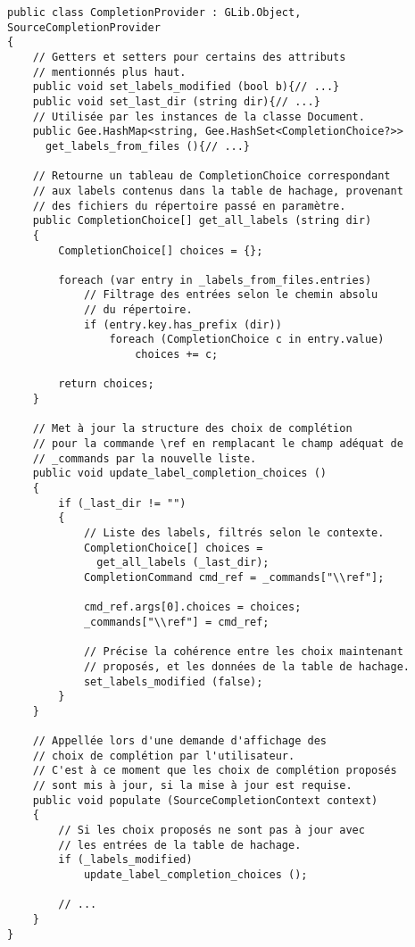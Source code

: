 \documentclass[a4paper,11pt]{report}
\begin{document}
\begin{lstlisting}[frame=single]
public class CompletionProvider : GLib.Object, SourceCompletionProvider
{
    // Getters et setters pour certains des attributs
    // mentionnés plus haut.
    public void set_labels_modified (bool b){// ...}
    public void set_last_dir (string dir){// ...}
    // Utilisée par les instances de la classe Document.
    public Gee.HashMap<string, Gee.HashSet<CompletionChoice?>> 
      get_labels_from_files (){// ...}
    
    // Retourne un tableau de CompletionChoice correspondant
    // aux labels contenus dans la table de hachage, provenant
    // des fichiers du répertoire passé en paramètre.
    public CompletionChoice[] get_all_labels (string dir)
    {
        CompletionChoice[] choices = {};
        
        foreach (var entry in _labels_from_files.entries)
            // Filtrage des entrées selon le chemin absolu
            // du répertoire.
            if (entry.key.has_prefix (dir))
                foreach (CompletionChoice c in entry.value)
                    choices += c;
        
        return choices;
    }
    
    // Met à jour la structure des choix de complétion
    // pour la commande \ref en remplacant le champ adéquat de
    // _commands par la nouvelle liste.
    public void update_label_completion_choices ()
    {
        if (_last_dir != "")
        {
            // Liste des labels, filtrés selon le contexte.
            CompletionChoice[] choices =
              get_all_labels (_last_dir);
            CompletionCommand cmd_ref = _commands["\\ref"];

            cmd_ref.args[0].choices = choices;
            _commands["\\ref"] = cmd_ref;

            // Précise la cohérence entre les choix maintenant
            // proposés, et les données de la table de hachage.
            set_labels_modified (false);
        }
    }
    
    // Appellée lors d'une demande d'affichage des
    // choix de complétion par l'utilisateur.
    // C'est à ce moment que les choix de complétion proposés
    // sont mis à jour, si la mise à jour est requise.
    public void populate (SourceCompletionContext context)
    {
        // Si les choix proposés ne sont pas à jour avec
        // les entrées de la table de hachage.
        if (_labels_modified)
            update_label_completion_choices ();
        
        // ...
    }
}
\end{lstlisting}
\end{document}
